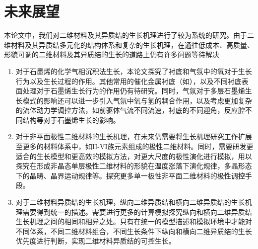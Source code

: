 \section{未来展望}
本论文中，我们对二维材料及其异质结的生长机理进行了较为系统的研究。由于二维材料及其异质结多元化的结构体系和复杂的生长机理，在通往低成本、高质量、形貌可调的二维材料及其异质结的生长的道路上仍有许多问题等待解决\chinesecolon
\begin{enumerate}[labelsep=0em,label=（\arabic*）,wide]
    \item 对于石墨烯的化学气相沉积法生长，本论文探究了衬底和气氛中的氧对于生长行为以及生长过程的作用。其他常用的催化金属衬底（如），以及不同衬底表面处理对于石墨烯生长行为的作用仍有待研究。同时，气氛对于多层石墨烯生长模式的影响还可以进一步引入气氛中氧与氢的耦合作用，以及考虑更加复杂的流体动力学调控方法，如前驱体气流不同流速，衬底的不同迎角，反应腔不同结构等对于石墨烯生长的影响。
    \item 对于非平面极性二维材料的生长机理，在未来仍需要将生长机理研究工作扩展至更多的材料体系中，如II-VI族元素组成的极性二维材料。同时，需要研发更适合的生长模型和更高效的模拟方法，对更大尺度的极性演化进行模拟，用以探究在形成非晶态单层极性二维材料的形貌在温度涨落下演化规律，多晶形态下的晶畴、晶界运动规律等。探究更多单一极性非平面二维材料的极性调控手段。
    \item 对于二维材料异质结的生长机理，纵向二维异质结和横向二维异质结的生长机理需要得到统一的描述。需要进行更多的计算模拟探究纵向和横向二维异质结生长机理之间的相同和相异之处。只有在统一的模型描述和模拟环境中才能对不同体系，不同二维材料组合，不同生长条件下纵向和横向二维异质结的生长优先度进行判断，实现二维材料异质结的可控生长。
\end{enumerate}